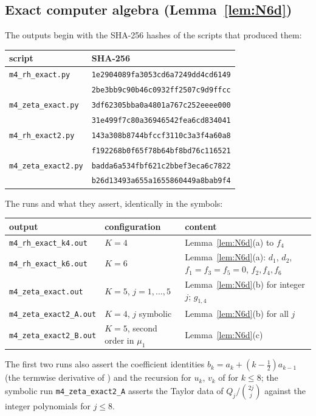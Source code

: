 \subsection*{Exact computer algebra (Lemma~\ref{lem:N6d})}
The outputs begin with the SHA-256 hashes of the scripts that produced them:
\begin{center}
\small
\begin{tabular}{ll}
\toprule
script & SHA-256\\
\midrule
\texttt{m4\_rh\_exact.py} & \texttt{1e2904089fa3053cd6a7249dd4cd6149}\\
 & \texttt{2be3bb9c90b46c0932ff2507c9d9ffcc}\\
\texttt{m4\_zeta\_exact.py} & \texttt{3df62305bba0a4801a767c252eeee000}\\
 & \texttt{31e499f7c80a36946542fea6cd834041}\\
\texttt{m4\_rh\_exact2.py} & \texttt{143a308b8744bfccf3110c3a3f4a60a8}\\
 & \texttt{f192268b0f65f78b64bf8bd76c116521}\\
\texttt{m4\_zeta\_exact2.py} & \texttt{badda6a534fbf621c2bbef3eca6c7822}\\
 & \texttt{b26d13493a655a1655860449a8bab9f4}\\
\bottomrule
\end{tabular}
\end{center}
The runs and what they assert, identically in the symbols:
\begin{center}
\small
\begin{tabular}{lp{4.2cm}p{5.6cm}}
\toprule
output & configuration & content\\
\midrule
\texttt{m4\_rh\_exact\_k4.out} & $K=4$ & Lemma~\ref{lem:N6d}(a) to $f_4$\\
\texttt{m4\_rh\_exact\_k6.out} & $K=6$ & Lemma~\ref{lem:N6d}(a): $d_1$, $d_2$, $f_1=f_3=f_5=0$, $f_2,f_4,f_6$\\
\texttt{m4\_zeta\_exact.out} & $K=5$, $j=1,\dots,5$ & Lemma~\ref{lem:N6d}(b) for integer $j$; $g_{1,4}$\\
\texttt{m4\_zeta\_exact2\_A.out} & $K=4$, $j$ symbolic & Lemma~\ref{lem:N6d}(b) for all $j$\\
\texttt{m4\_zeta\_exact2\_B.out} & $K=5$, second order in $\mu_1$ & Lemma~\ref{lem:N6d}(c)\\
\bottomrule
\end{tabular}
\end{center}
The first two runs also assert the coefficient identities $b_k=a_k+(k-\frac12)a_{k-1}$ (the termwise derivative of
\cite[(10.40.2)]{DLMF}) and the recursion for $u_k$, $v_k$ of \cite[(9.7.2)]{DLMF} for $k\le8$; the symbolic run \texttt{m4\_zeta\_exact2\_A} asserts the
Taylor data of $Q_j/\binom{2j}j$ against the integer polynomials for $j\le8$.

